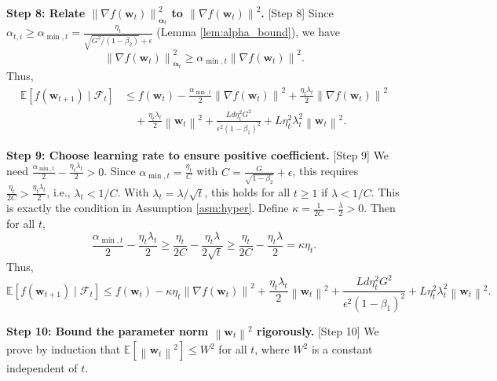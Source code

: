 \documentclass{article}
\theoremstyle{plain}
\theoremstyle{definition}
\renewcommand{\vec}[1]{\boldsymbol{#1}}
\newcommand{\norm}[1]{\left\| #1 \right\|}
\newcommand{\expect}[1]{\mathbb{E}\left[ #1 \right]}
\begin{document}
\textbf{Step 8: Relate $\norm{\nabla f(\vec{w}_t)}_{\vec{\alpha}_t}^2$ to $\norm{\nabla f(\vec{w}_t)}^2$.} [Step 8]
Since $\alpha_{t,i} \ge \alpha_{\min,t} = \frac{\eta_t}{\sqrt{G^2/(1-\beta_2)} + \epsilon}$ (Lemma \ref{lem:alpha_bound}), we have
\begin{equation}
    \norm{\nabla f(\vec{w}_t)}_{\vec{\alpha}_t}^2 \ge \alpha_{\min,t} \norm{\nabla f(\vec{w}_t)}^2.
\end{equation}
Thus,
\begin{align}
    \expect{f(\vec{w}_{t+1}) \mid \mathcal{F}_t} &\le f(\vec{w}_t) - \frac{\alpha_{\min,t}}{2} \norm{\nabla f(\vec{w}_t)}^2 + \frac{\eta_t \lambda_t}{2} \norm{\nabla f(\vec{w}_t)}^2 \\
    &\quad + \frac{\eta_t \lambda_t}{2} \norm{\vec{w}_t}^2 + \frac{L d \eta_t^2 G^2}{\epsilon^2 (1-\beta_1)^2} + L \eta_t^2 \lambda_t^2 \norm{\vec{w}_t}^2.
\end{align}

\textbf{Step 9: Choose learning rate to ensure positive coefficient.} [Step 9]
We need $\frac{\alpha_{\min,t}}{2} - \frac{\eta_t \lambda_t}{2} > 0$. Since $\alpha_{\min,t} = \frac{\eta_t}{C}$ with $C = \frac{G}{\sqrt{1-\beta_2}} + \epsilon$, this requires $\frac{\eta_t}{2C} > \frac{\eta_t \lambda_t}{2}$, i.e., $\lambda_t < 1/C$. With $\lambda_t = \lambda/\sqrt{t}$, this holds for all $t \ge 1$ if $\lambda < 1/C$. This is exactly the condition in Assumption \ref{asm:hyper}. Define $\kappa = \frac{1}{2C} - \frac{\lambda}{2} > 0$. Then for all $t$,
\begin{equation}
    \frac{\alpha_{\min,t}}{2} - \frac{\eta_t \lambda_t}{2} \ge \frac{\eta_t}{2C} - \frac{\eta_t \lambda}{2\sqrt{t}} \ge \frac{\eta_t}{2C} - \frac{\eta_t \lambda}{2} = \kappa \eta_t.
\end{equation}
Thus,
\begin{equation}
    \expect{f(\vec{w}_{t+1}) \mid \mathcal{F}_t} \le f(\vec{w}_t) - \kappa \eta_t \norm{\nabla f(\vec{w}_t)}^2 + \frac{\eta_t \lambda_t}{2} \norm{\vec{w}_t}^2 + \frac{L d \eta_t^2 G^2}{\epsilon^2 (1-\beta_1)^2} + L \eta_t^2 \lambda_t^2 \norm{\vec{w}_t}^2.
\end{equation}

\textbf{Step 10: Bound the parameter norm $\norm{\vec{w}_t}^2$ rigorously.} [Step 10]
We prove by induction that $\expect{\norm{\vec{w}_t}^2} \le W^2$ for all $t$, where $W^2$ is a constant independent of $t$. 
\end{document}
